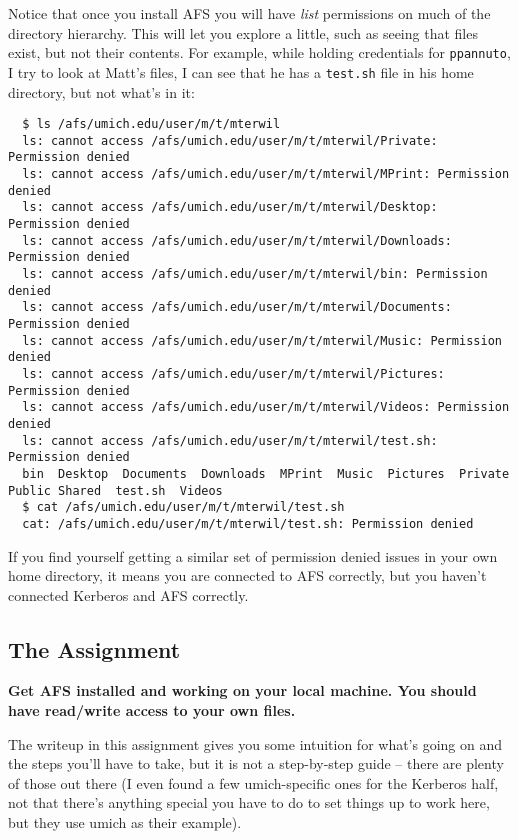 \documentclass{article}
\begin{document}
Notice that once you install AFS you will have \emph{list} permissions on much
of the directory hierarchy. This will let you explore a little, such as seeing
that files exist, but not their contents. For example, while holding
credentials for \texttt{ppannuto}, I try to look at Matt's files, I can see
that he has a \texttt{test.sh} file in his home directory, but not what's in
it:

\begin{lstlisting}
  $ ls /afs/umich.edu/user/m/t/mterwil
  ls: cannot access /afs/umich.edu/user/m/t/mterwil/Private: Permission denied
  ls: cannot access /afs/umich.edu/user/m/t/mterwil/MPrint: Permission denied
  ls: cannot access /afs/umich.edu/user/m/t/mterwil/Desktop: Permission denied
  ls: cannot access /afs/umich.edu/user/m/t/mterwil/Downloads: Permission denied
  ls: cannot access /afs/umich.edu/user/m/t/mterwil/bin: Permission denied
  ls: cannot access /afs/umich.edu/user/m/t/mterwil/Documents: Permission denied
  ls: cannot access /afs/umich.edu/user/m/t/mterwil/Music: Permission denied
  ls: cannot access /afs/umich.edu/user/m/t/mterwil/Pictures: Permission denied
  ls: cannot access /afs/umich.edu/user/m/t/mterwil/Videos: Permission denied
  ls: cannot access /afs/umich.edu/user/m/t/mterwil/test.sh: Permission denied
  bin  Desktop  Documents  Downloads  MPrint  Music  Pictures  Private  Public Shared  test.sh  Videos
  $ cat /afs/umich.edu/user/m/t/mterwil/test.sh
  cat: /afs/umich.edu/user/m/t/mterwil/test.sh: Permission denied
\end{lstlisting}

If you find yourself getting a similar set of permission denied issues in your
own home directory, it means you are connected to AFS correctly, but you
haven't connected Kerberos and AFS correctly.


\subsection*{The Assignment}

\textbf{Get AFS installed and working on your local machine. You should have
read/write access to your own files.}

The writeup in this assignment gives you some intuition for what's going on
and the steps you'll have to take, but it is not a step-by-step guide -- there
are plenty of those out there (I even found a few umich-specific ones for the
Kerberos half, not that there's anything special you have to do to set things
up to work here, but they use umich as their example).
\end{document}
